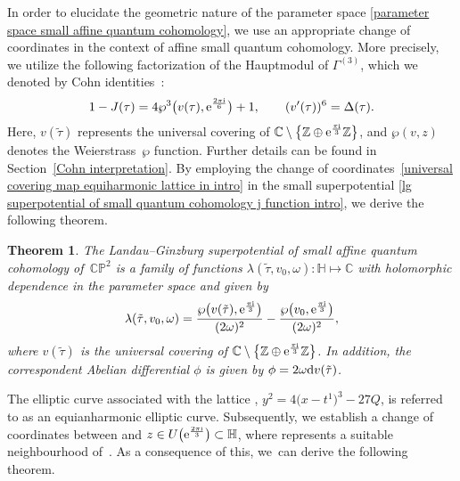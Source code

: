 \documentclass[pdftex]{sigma}
\numberwithin{equation}{section}
\newtheorem{Theorem}{Theorem}[section]
\begin{document}
In order to elucidate the geometric nature of the parameter space \eqref{parameter space small affine quantum cohomology}, we use an appropriate change of coordinates in the context of affine small quantum cohomology. More precisely, we utilize the following factorization of the Hauptmodul of $\Gamma^{(3)}$, which we denoted by Cohn identities~\cite{M.Batchelor,Cohn,Golubev}:
\begin{gather}
1-J(\tau)=4\wp^3\bigl(v(\tau),{\rm e}^{\frac{2\pi {\rm i}}{6}}\bigr)+1,\qquad
(v'(\tau))^6=\Delta(\tau).\label{universal covering map equiharmonic lattice in intro}
\end{gather}
Here, $v(\tilde{\tau})$ represents the universal covering of $\mathbb{C}\setminus\bigl\{\mathbb{Z}\oplus {\rm e}^{\frac{\pi {\rm i}}{3}}\mathbb{Z} \bigr\}$, and $\wp(v,z)$ denotes the Weierstrass~$\wp$ function. Further details can be found in Section~\ref{Cohn interpretation}. By employing the change of coordinates~\eqref{universal covering map equiharmonic lattice in intro} in the small superpotential \eqref{lg superpotential of small quantum cohomology j function intro}, we derive the following theorem.

\begin{Theorem}
The Landau--Ginzburg superpotential of small affine quantum cohomology \linebreak of~$\mathbb{CP}^2$ is a family of functions
$\lambda(\tilde\tau, v_0, \omega)\colon \mathbb{H} \mapsto \mathbb{C}$
with holomorphic dependence in the parameter space
 and given by
\begin{gather*}
\lambda(\tilde\tau,v_0,\omega)=\frac{\wp\bigl(v(\tilde\tau),{\rm e}^{\frac{\pi {\rm i} }{3}}\bigr)}{(2\omega)^2}-\frac{\wp\bigl(v_0,{\rm e}^{\frac{\pi {\rm i} }{3}}\bigr)}{(2\omega)^2},
\end{gather*}
where $v(\tilde\tau)$ is the universal covering of $\mathbb{C}\setminus\bigl\{\mathbb{Z}\oplus {\rm e}^{\frac{\pi {\rm i}}{3}}\mathbb{Z} \bigr\}$.
 In addition, the correspondent Abelian differential $\phi$ is given by
$
\phi=2\omega {\rm d}v(\tilde\tau)$.

\end{Theorem}

The elliptic curve associated with the lattice ,
$y^2=4\bigl(x-t^1\bigr)^3-27Q$, is referred to as an equianharmonic elliptic curve.
Subsequently, we establish a change of coordinates between  and $\smash{z \in U\bigl({\rm e}^{\frac{2\pi {\rm i}}{3}}\bigr)}\allowbreak \subset \mathbb{H}$, where  represents a suitable neighbourhood of~. As a consequence of this, we~can derive the following theorem.
\end{document}

